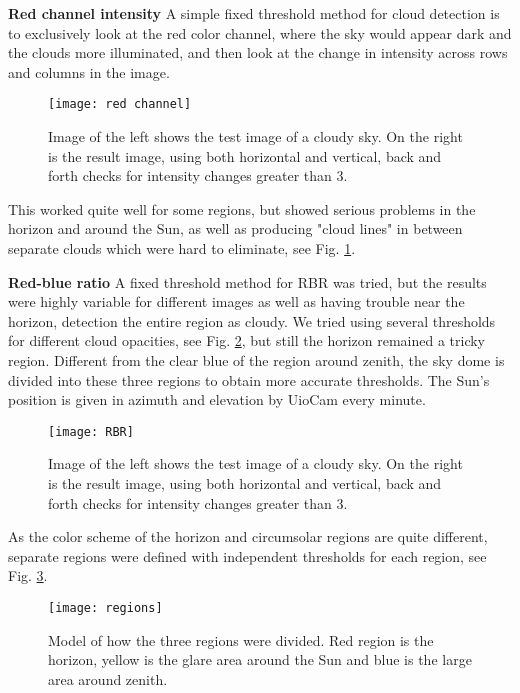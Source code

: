 \documentclass[]{book}
\begin{document}
		\textbf{Red channel intensity}
		A simple fixed threshold method for cloud detection is to exclusively look at the red color channel, where the sky would appear dark and the clouds more illuminated, and then look at the change in intensity across rows and columns in the image.
		
		\begin{figure} [ht]
			\texttt{[image: red channel]}
			\caption{Image of the left shows the test image of a cloudy sky. On the right is the result image,
				using both horizontal and vertical, back and forth checks for intensity changes greater than 3.}
			\label{fig: red channel}
		\end{figure}

		This worked quite well for some regions, but showed serious problems in the horizon and around the Sun, as well as producing "cloud lines" in between separate clouds which were hard to eliminate, see Fig. \ref{fig: red channel}.
		
		\textbf{Red-blue ratio}
		A fixed threshold method for RBR was tried, but the results were highly variable for different images as well as having trouble near the horizon, detection the entire region as cloudy. We tried using several thresholds for different cloud opacities, see Fig. \ref{fig: RBR}, but still the horizon remained a tricky region. Different from the clear blue of the region around zenith, the sky dome is divided into these three regions to obtain more accurate thresholds. The Sun’s position is given in azimuth and elevation by UioCam every minute.
		
		\pagebreak

		\begin{figure} [ht]
			\centering
			\texttt{[image: RBR]}
			\caption{Image of the left shows the test image of a cloudy sky. On the right is the result image, using both horizontal and vertical, back and forth checks for intensity changes greater than 3.}
			\label{fig: RBR}
		\end{figure}

		As the color scheme of the horizon and circumsolar regions are quite different, separate regions were defined with independent thresholds for each region, see Fig. \ref{fig: regions}.

		\begin{figure} [ht]
			\centering
			\texttt{[image: regions]}
			\caption{Model of how the three regions were divided. Red region is the horizon, yellow is the glare area around the Sun and blue is the large area around zenith.}
			\label{fig: regions}
		\end{figure}
\end{document}
